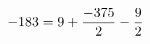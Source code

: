 \documentclass[preview]{standalone}
\begin{document}
\begin{align*}
\special{dvisvgm:raw <g id='unique000'>}-183 = 9 +\frac{-375}{2} - \frac{9}{2}\special{dvisvgm:raw </g>}
\end{align*}
\end{document}
